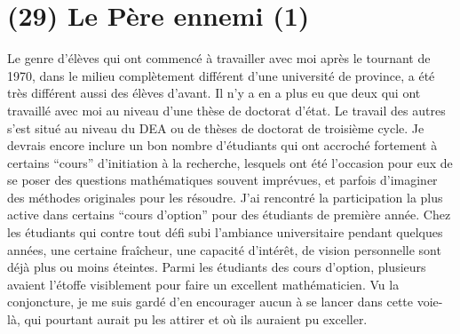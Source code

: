 \section{(29) Le Père ennemi (1)}

Le genre d'élèves qui ont commencé à travailler avec moi après le tournant de 1970, dans le milieu complètement différent d'une université de province, a été très différent aussi des élèves d'avant. Il n'y a en a plus eu que deux qui ont travaillé avec moi au niveau d'une thèse de doctorat d'état. Le travail des autres s'est situé au niveau du DEA ou de thèses de doctorat de troisième cycle. Je devrais encore inclure un bon nombre d'étudiants qui ont accroché fortement à certains ``cours'' d'initiation à la recherche, lesquels ont été l'occasion pour eux de se poser des questions mathématiques souvent imprévues, et parfois d'imaginer des méthodes originales pour les résoudre. J'ai rencontré la participation la plus active dans certains ``cours d'option'' pour des étudiants de première année. Chez les étudiants qui contre tout défi subi l'ambiance universitaire pendant quelques années, une certaine fraîcheur, une capacité d'intérêt, de vision personnelle sont déjà plus ou moins éteintes. Parmi les étudiants des cours d'option, plusieurs avaient l'étoffe visiblement pour faire un excellent mathématicien. Vu la conjoncture, je me suis gardé d'en encourager aucun à se lancer dans cette voie-là, qui pourtant aurait pu les attirer et où ils auraient pu exceller.

